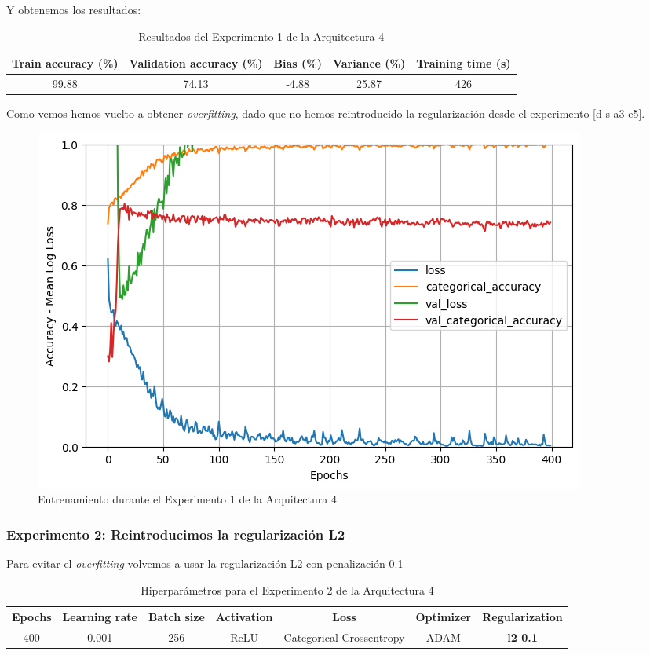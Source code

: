 \documentclass{article}
\begin{document}
			Y obtenemos los resultados:
			\begin{table}[!h]
				\begin{center}
					\begin{tabular}{| c | c | c | c | c |}
						\textbf{Train accuracy (\%)} & \textbf{Validation accuracy (\%)} & \textbf{Bias (\%)} & \textbf{Variance (\%)} & \textbf{Training time (s)} \\ \hline
						99.88 & 74.13 & -4.88 & 25.87 & 426 \\ \hline
					\end{tabular}
					\caption{Resultados del Experimento 1 de la Arquitectura 4}
					\label{tab:res-d-a4-e	}
				\end{center}
			\end{table}
			
			Como vemos hemos vuelto a obtener \textit{overfitting}, dado que no hemos reintroducido la regularizaci\'on desde el experimento \ref{d-s-a3-e5}.
			\begin{figure}[!h]
				\begin{center}
					\includegraphics[scale=0.5]{d-tr-a4-e1.png}		
					\caption{Entrenamiento durante el Experimento 1 de la Arquitectura 4}	
					\label{d-tr-a4-e1}
				\end{center}
			\end{figure}
			
		\subsubsection{Experimento 2: Reintroducimos la regularizaci\'on L2}
		\label{d-s-a4-e2}
			Para evitar el \textit{overfitting} volvemos a usar la regularizaci\'on L2 con penalizaci\'on 0.1
			\begin{table}[!h]
				\begin{tabular}{| c | c | c | c | c | c | c |}
					\textbf{Epochs} & \textbf{Learning rate} & \textbf{Batch size} & \textbf{Activation} & \textbf{Loss} & \textbf{Optimizer} & \textbf{Regularization} \\ \hline
					400 & 0.001 & 256 & ReLU & Categorical Crossentropy & ADAM & \textbf{l2 0.1}
				\end{tabular}
				\caption{Hiperpar\'ametros para el Experimento 2 de la Arquitectura 4}
				\label{tab:hip-d-a4-e2}
			\end{table}
			
\end{document}
